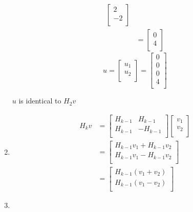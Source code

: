 \documentclass[11pt]{article}
\begin{document}
\begin{enumerate}
\begin{align*}
				\begin{bmatrix} 
					2  \\ 
					-2 \\
				\end{bmatrix}	\\
			&= 
				\begin{bmatrix} 
					0  \\ 
					4 \\
				\end{bmatrix}					
	\end{align*}
	\[
		u =
		\begin{bmatrix}
			u_1 \\
			u_2 \\
		\end{bmatrix}
		=
		\begin{bmatrix}
			0 \\
			0 \\
			0 \\
			4 \\
		\end{bmatrix}		
	\]
	
	$u$ is identical to $H_2v$
	
	\item
	\begin{align}
		H_kv &= 			
				\begin{bmatrix} 
					H_{k-1} & H_{k-1} \\ 
					H_{k-1} & -H_{k-1} \\ 
				\end{bmatrix}
				\begin{bmatrix}
					v_1 \\
					v_2 \\
				\end{bmatrix} \nonumber \\
			&= 
				\begin{bmatrix} 
					H_{k-1}v_1 + H_{k-1} v_2 \\ 
					H_{k-1}v_1 - H_{k-1} v_2 \\ 
				\end{bmatrix} \label{eq3} 	\\
			&= 		
				\begin{bmatrix} 
					H_{k-1}(v_1 + v_2)  \\ 
					H_{k-1}(v_1 - v_2) \nonumber   \\ 
				\end{bmatrix}	
	\end{align}
	
	\item
	

\end{enumerate}
\end{document}
